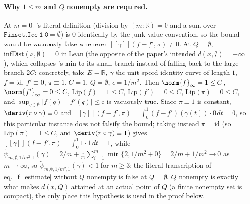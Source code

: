 \begin{lemma}
  \paragraph{Why $1 \le m$ and $Q$ nonempty are required.} At $m=0$, 's literal
  definition (division by $(m:\mathbb{R})=0$ and a sum over $\mathtt{Finset.Icc\ 1\ 0}=\emptyset$)
  is $0$ identically by the junk-value convention, so the bound would be vacuously false whenever
  $[[\gamma]](f-f',\pi)\ne0$. At $Q=\emptyset$, $\mathrm{infDist}(x,\emptyset)=0$ in Lean (the
  opposite of the paper's intended $d(x,\emptyset)=+\infty$), which collapses 's
  min to its small branch instead of falling back to the large branch $2C$: concretely, take
  $E=\mathbb{R}$, $\gamma$ the unit-speed identity curve of length $1$, $f=\mathrm{id}$,
  $f'\equiv0$, $\pi\equiv1$, $C=1$, $Q=\emptyset$, $\epsilon=1/m^2$. Then $\norm{f}_\infty=1\le C$,
  $\norm{f'}_\infty=0\le C$, $\mathrm{Lip}(f)=1\le C$, $\mathrm{Lip}(f')=0\le C$,
  $\mathrm{Lip}(\pi)=0\le C$, and $\sup_{q\in\emptyset}|f(q)-f'(q)|\le\epsilon$ is vacuously true.
  Since $\pi\equiv1$ is constant, $\deriv(\pi\circ\gamma)\equiv0$ and
  $[[\gamma]](f-f',\pi)=\int_0^1 (f-f')(\gamma(t))\cdot 0\,dt=0$, so this particular instance does
  not falsify the bound; taking instead $\pi=\mathrm{id}$ (so $\mathrm{Lip}(\pi)=1\le C$, and
  $\deriv(\pi\circ\gamma)\equiv1$) gives $[[\gamma]](f-f',\pi)=\int_0^1 1\cdot1\,dt=1$, while
  $\tilde\psi_{m,\emptyset,1/m^2,1}(\gamma) = 2/m + \tfrac1m\sum_{i=1}^m\min\{2,1/m^2+0\} =
  2/m+1/m^2 \to 0$ as $m\to\infty$, so $\tilde\psi_{m,\emptyset,1/m^2,1}(\gamma) < 1$ for $m\ge3$:
  the literal transcription of eq.~\eqref{f_estimate} without $Q$ nonempty is false at $Q=\emptyset$.
  $Q$ nonempty is exactly what makes $d(x,Q)$ attained at an actual point of $Q$ (a finite nonempty
  set is compact), the only place this hypothesis is used in the proof below.
\end{lemma}
